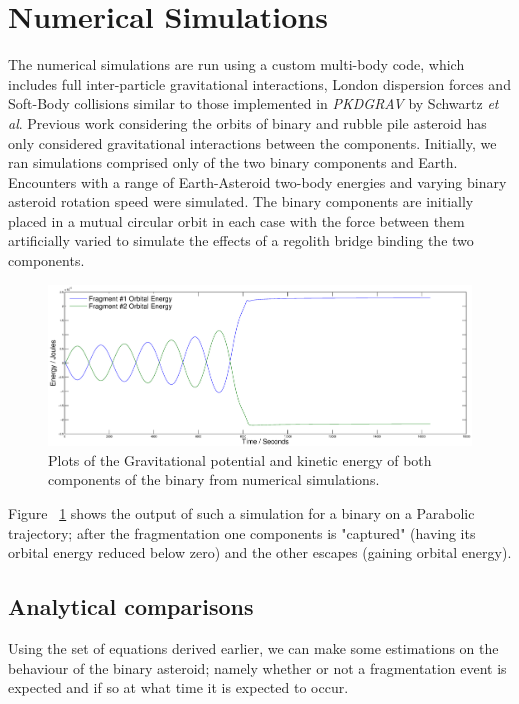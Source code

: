 \documentclass[letterpaper, preprint, paper,11pt]{AAS}	%
\begin{document}
\section{Numerical Simulations}
The numerical simulations are run using a custom multi-body code, which includes full inter-particle gravitational interactions, London dispersion forces and Soft-Body collisions similar to those implemented in \textit{PKDGRAV} by Schwartz \textit{et al}\cite{soft}.
Previous work considering the orbits of binary and rubble pile asteroid has only considered gravitational interactions between the components. 
Initially, we ran simulations comprised only of the two binary components and Earth. Encounters with a range of Earth-Asteroid two-body energies and varying binary asteroid rotation speed were simulated. The binary components are initially placed in a mutual circular orbit in each case with the force between them artificially varied to simulate the effects of a regolith bridge binding the two components.
\begin{figure}[H]
\centering
\centerline{\includegraphics[width=1.2\textwidth]{binary_num.eps}} 
\caption{Plots of the Gravitational potential and kinetic energy of both components of the binary from numerical simulations.} 
\label{fig:Num}
\end{figure}
 Figure ~\ref{fig:Num} shows the output of such a simulation for a binary on a Parabolic trajectory; after the fragmentation one components is "captured" (having its orbital energy reduced below zero) and the other escapes (gaining orbital energy).  
 
\subsection{Analytical comparisons}

Using the set of equations derived earlier, we can make some estimations on the behaviour of the binary asteroid; namely whether or not a fragmentation event is expected and if so at what time it is expected to occur.
\end{document}
